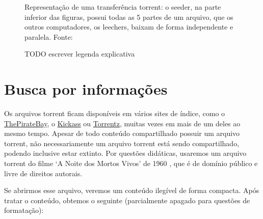 \begin{figure}
    \vspace{\myvsize}

    \begin{subfigure}[hb!]{\myhsize}
        \caption{}
        \label{fig:torrent-repr-9}
    \end{subfigure}

    \caption{Representação de uma transferência torrent: o \gls{seeder}, na parte
    inferior das figuras, possui todas as 5 partes de um arquivo, que os outros
    computadores, os \glspl{leecher}, baixam de forma independente e paralela. Fonte:
    \cite{fig:torrent-dl}}
    \label{fig:torrent-repr}
\end{figure}


\begin{figure}[ht!]
    \centering
    \caption{TODO escrever legenda explicativa}
    \label{fig:torrent-universo}
\end{figure}


\afterpage{\clearpage}

\section{Busca por informações}

Os arquivos \gls*{torrent} ficam disponíveis em vários sites de índice, como o
\href{http://thepiratebay.sx/}{ThePirateBay}, o \href{http://kickass.to/}{Kickass} ou
\href{https://torrentz.eu/}{Torrentz}, muitas vezes em mais de um deles ao mesmo tempo.
Apesar de todo conteúdo compartilhado possuir um arquivo \gls*{torrent}, não
necessariamente um arquivo \gls*{torrent} está sendo compartilhado, podendo inclusive
estar extinto. Por questões didáticas, usaremos um arquivo torrent do filme `A Noite
dos Mortos Vivos' de 1960 \cite{torrent-file}, que é de domínio público e livre de
direitos autorais.

Se abrirmos esse arquivo, veremos um conteúdo ilegível de forma compacta. Após tratar o
conteúdo, obtemos o seguinte (parcialmente apagado para questões de formatação):

